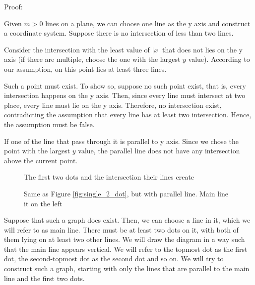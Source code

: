 \documentclass[a4paper, 12pt]{article}
\begin{document}
Proof:

Given $m>0$ lines on a plane, we can choose one line as the y axis and construct a coordinate system. Suppose there is no intersection of less than two lines. 

Consider the intersection with the least value of $|x|$ that does not lies on the y axis (if there are multiple, choose the one with the largest $y$ value). According to our assumption, on this point lies at least three lines.

Such a point must exist. To show so, suppose no such point exist, that is, every intersection happens on the y axis. Then, since every line must intersect at two place, every line must lie on the y axis. Therefore, no intersection exist, contradicting the assumption that every line has at least two intersection. Hence, the assumption must be false.

If one of the line that pass through it is parallel to y axis. Since we chose the point with the largest $y$ value, the parallel line does not have any intersection above the current point. %


\begin{wrapfigure}{r}{0.25\textwidth}
    
    \caption{The first two dots and the intersection their lines create}
    \label{fig:single_2_dot}
    \vspace{1.5\baselineskip}
    
    \caption{Same as Figure \ref{fig:single_2_dot}, but with parallel line. Main line it on the left}
    \label{fig:double_2_dot}
    \vspace{-1.5\baselineskip}
\end{wrapfigure}
Suppose that such a graph does exist. Then, we can choose a line in it, which we will refer to as main line. There must be at least two dots on it, with both of them lying on at least two other lines. We will draw the diagram in a way such that the main line appears vertical. We will refer to the topmost dot as the first dot, the second-topmost dot as the second dot and so on. We will try to construct such a graph, starting with only the lines that are parallel to the main line and the first two dots.
\end{document}
